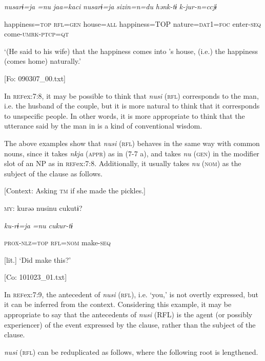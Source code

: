     \textit{nusarɨ=ja}  \textit{=nu}  \textit{jaa=kaci}  \textit{nusarɨ=ja}  \textit{sizin=n=du} \textit{hənk-tɨ}  \textit{k-jur-n=ccjɨ}
                                                                                                    
    happiness=\textsc{top}  \textsc{rfl}=\textsc{gen}  house=\textsc{all}  happiness=TOP  nature=\textsc{dat}1=\textsc{foc}  enter-\textsc{seq}  come-\textsc{umrk}-\textsc{ptcp}=\textsc{qt}

    ‘(He said to his wife) that the happiness comes into ’s house, (i.e.) the happiness (comes home) naturally.’

    [Fo: 090307\_00.txt]
\z

In \textsc{ref}{ex:7:8}, it may be possible to think that \textit{nusi} (\textsc{rfl}) corresponds to the man, i.e. the husband of the couple, but it is more natural to think that it corresponds to unspecific people. In other words, it is more appropriate to think that the utterance said by the man in  is a kind of conventional wisdom.

  The above examples show that \textit{nusi} (\textsc{rfl}) behaves in the same way with common nouns, since it takes \textit{nkja} (\textsc{appr}) as in (7-7 a), and takes \textit{nu} (\textsc{gen}) in the modifier slot of an NP as in \textsc{ref}{ex:7:8}. Additionally, it usually takes \textit{nu} (\textsc{nom}) as the subject of the clause as follows.

\ea \label{ex:7:9}  [Context: Asking \textsc{tm} if she made the pickles.]

  \textsc{my}:  kurəə  nusinu  cukutɨ?

    \textit{ku-rɨ=ja}  \textit{=nu}  \textit{cukur-tɨ}

    \textsc{prox}-\textsc{nlz}=\textsc{top}  \textsc{rfl}=\textsc{nom}  make-\textsc{seq}

    [lit.] ‘Did  make this?’

    [Co: 101023\_01.txt]
\z

In \textsc{ref}{ex:7:9}, the antecedent of \textit{nusi} (\textsc{rfl}), i.e. ‘you,’ is not overtly expressed, but it can be inferred from the context. Considering this example, it may be appropriate to say that the antecedents of \textit{nusi} (RFL) is the agent (or possibly experiencer) of the event expressed by the clause, rather than the subject of the clause.

\textit{nusi} (\textsc{rfl}) can be reduplicated as follows, where the following root is lengthened.

